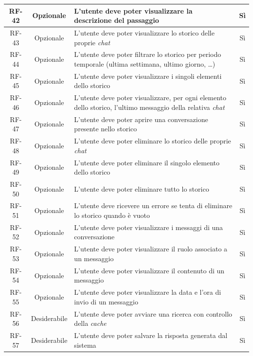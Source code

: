 \begin{center}
\begin{xltabular}{\textwidth}{|c|c| >{\arraybackslash}X|c|}
        \hline
        RF-42 & Opzionale & L'utente deve poter visualizzare la descrizione del passaggio & Sì \\
        \hline
        RF-43 & Opzionale & L'utente deve poter visualizzare lo storico delle proprie \textit{chat} & Sì \\
        \hline
        RF-44 & Opzionale & L'utente deve poter filtrare lo storico per periodo temporale (ultima settimana, ultimo giorno, \dots) & Sì \\
        \hline
        RF-45 & Opzionale & L'utente deve poter visualizzare i singoli elementi dello storico & Sì \\
        \hline
        RF-46 & Opzionale & L'utente deve poter visualizzare, per ogni elemento dello storico, l'ultimo messaggio della relativa \textit{chat} & Sì \\
        \hline
        RF-47 & Opzionale & L'utente deve poter aprire una conversazione presente nello storico & Sì \\
        \hline
        RF-48 & Opzionale & L'utente deve poter eliminare lo storico delle proprie \textit{chat} & Sì \\
        \hline
        RF-49 & Opzionale & L'utente deve poter eliminare il singolo elemento dello storico & Sì \\
        \hline
        RF-50 & Opzionale & L'utente deve poter eliminare tutto lo storico & Sì \\
        \hline
        RF-51 & Opzionale & L'utente deve ricevere un errore se tenta di eliminare lo storico quando è vuoto & Sì \\
        \hline
        RF-52 & Opzionale & L'utente deve poter visualizzare i messaggi di una conversazione & Sì \\
        \hline
        RF-53 & Opzionale & L'utente deve poter visualizzare il ruolo associato a un messaggio & Sì \\
        \hline
        RF-54 & Opzionale & L'utente deve poter visualizzare il contenuto di un messaggio & Sì \\
        \hline
        RF-55 & Opzionale & L'utente deve poter visualizzare la data e l'ora di invio di un messaggio & Sì \\
        \hline
        RF-56 & Desiderabile & L'utente deve poter avviare una ricerca con controllo della \textit{cache} & Sì \\
        \hline
        RF-57 & Desiderabile & L'utente deve poter salvare la risposta generata dal sistema & Sì \\

\end{xltabular}
\end{center}
